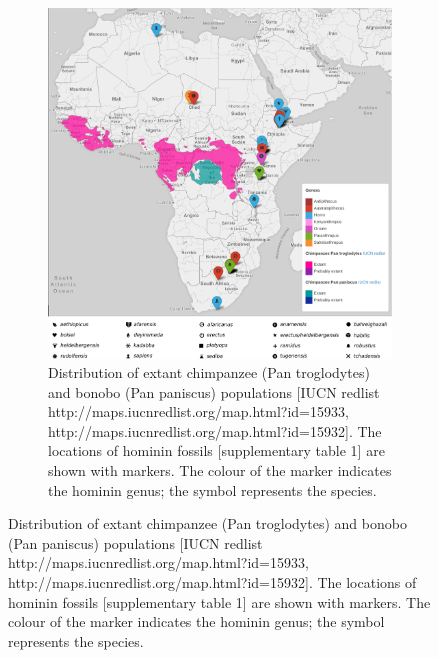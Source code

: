 \documentclass[fleqn,10pt]{wlscirep}
\begin{document}
\begin{figure}
\begin{subfigure}[b]{\textwidth}
  \centering
  \includegraphics[width=\textwidth]{figs/chimpanzee}
  \caption{Distribution of extant chimpanzee (Pan troglodytes) and bonobo (Pan paniscus) populations [IUCN redlist http://maps.iucnredlist.org/map.html?id=15933, http://maps.iucnredlist.org/map.html?id=15932]. The locations of hominin fossils [supplementary table 1] are shown with markers. The colour of the marker indicates the hominin genus; the symbol represents the species.}
  \label{fig:chimpanzee}
\end{subfigure}
\end{figure}
\end{document}

